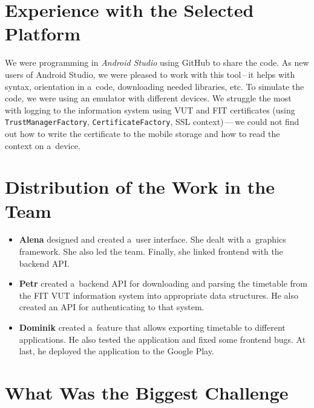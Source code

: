 \documentclass[12pt, a4paper, titlepage, final]{article}
\begin{document}

\section*{Experience with the Selected Platform}

We were programming in \emph{Android Studio} using GitHub to share the code. As
new users of Android Studio, we were pleased to work with this tool\,--\,it helps
with syntax, orientation in a~code, downloading needed libraries, etc. To
simulate the code, we were using an emulator with different devices. We struggle
the most with logging to the information system using VUT and FIT certificates
(using \texttt{TrustManagerFactory}, \texttt{CertificateFactory}, SSL
context)\,---\,we could not find out how to write the certificate to the mobile
storage and how to read the context on a~device.


\section*{Distribution of the Work in the Team}

\begin{itemize}
	\item
		\textbf{Alena} designed and created a~user interface. She dealt with
		a~graphics framework. She also led the team. Finally, she linked
		frontend with the backend API.

	\item
		\textbf{Petr} created a~backend API for downloading and parsing
		the timetable from the FIT VUT information system into appropriate
		data structures. He also created an API for authenticating to that
		system.

	\item
		\textbf{Dominik} created a~feature that allows exporting timetable
		to different applications. He also tested the application and fixed
		some frontend bugs. At last, he deployed the application to the
		Google Play.
\end{itemize}


\section*{What Was the Biggest Challenge}
\end{document}
